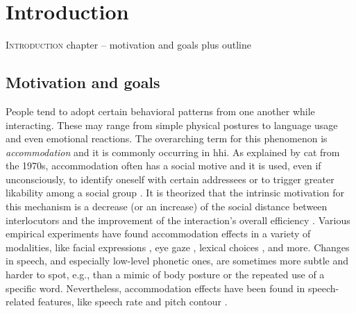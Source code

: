 \chapter{Introduction}
\label{chap:introduction}

\lettrine{I}{ntroduction} chapter -- motivation and goals plus outline

\pagebreak

\section{Motivation and goals}
\label{sec:motivation_and_goals}

People tend to adopt certain behavioral patterns from one another while interacting.
These may range from simple physical postures to language usage and even emotional reactions.
The overarching term for this phenomenon is \emph{accommodation} and it is commonly occurring in \acl{hhi}.
As explained by \acl{cat} from the 1970s, accommodation often has a social motive and it is used, even if unconsciously, to identify oneself with certain addressees or to trigger greater likability among a social group \citep{Giles2007CAT}.
It is theorized that the intrinsic motivation for this mechanism is a decrease (or an increase) of the social distance between interlocutors and the improvement of the interaction's overall efficiency \citep{Gallois2015CAT}.
Various empirical experiments have found accommodation effects in a variety of modalities, like facial expressions \citep{Kinsbourne2009embodied}, eye gaze \citep{Leong2017speaker}, lexical choices \citep{Brennan1996lexical}, and more.
Changes in speech, and especially low-level phonetic ones, are sometimes more subtle and harder to spot, e.g., than a mimic of body posture or the repeated use of a specific word.
Nevertheless, accommodation effects have been found in speech-related features, like speech rate \citep{Levitan2011measuring, Local2007phonetic} and pitch contour \citep{Babel2012role}.

